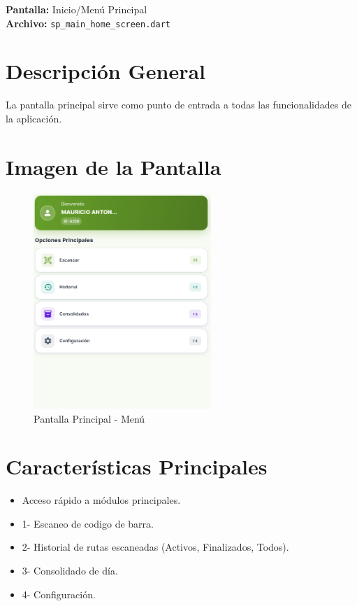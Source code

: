 \documentclass[12pt,a4paper]{report}
\begin{document}
\begin{pantallabox}
\textbf{Pantalla:} Inicio/Menú Principal \\
\textbf{Archivo:} \texttt{sp\_main\_home\_screen.dart}
\end{pantallabox}

\section{Descripción General}
La pantalla principal sirve como punto de entrada a todas las funcionalidades de la aplicación.

\section{Imagen de la Pantalla}
\begin{figure}[H]
    \centering
    \includegraphics[width=0.6\textwidth]{pantallas/dashbord.png}    
    \caption{Pantalla Principal - Menú}
    \label{fig:main_home}
\end{figure}

\section{Características Principales}
\begin{caracteristicabox}
\begin{itemize}[leftmargin=*]
    \item Acceso rápido a módulos principales.
    \item 1- Escaneo de codigo de barra.
    \item 2- Historial de rutas escaneadas (Activos, Finalizados, Todos).
    \item 3- Consolidado de día.
    \item 4- Configuración.
\end{itemize}
\end{caracteristicabox}
\end{document}
